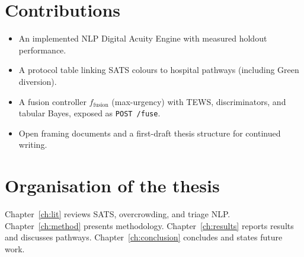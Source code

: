 \section{Contributions}

\begin{itemize}
  \item An implemented NLP Digital Acuity Engine with measured holdout performance.
  \item A protocol table linking SATS colours to hospital pathways (including Green diversion).
  \item A fusion controller \(f_{\mathrm{fusion}}\) (max-urgency) with TEWS, discriminators, and tabular Bayes, exposed as \texttt{POST /fuse}.
  \item Open framing documents and a first-draft thesis structure for continued writing.
\end{itemize}

\section{Organisation of the thesis}

Chapter~\ref{ch:lit} reviews SATS, overcrowding, and triage NLP. Chapter~\ref{ch:method} presents methodology. Chapter~\ref{ch:results} reports results and discusses pathways. Chapter~\ref{ch:conclusion} concludes and states future work.
